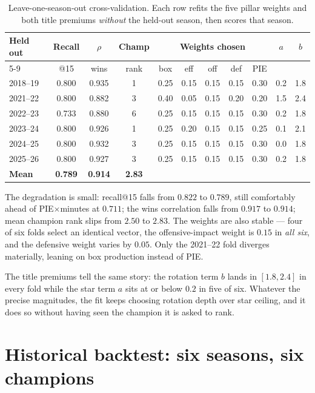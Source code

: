 \documentclass[11pt]{article}
\begin{document}
\begin{table}[h]\centering
\caption{Leave-one-season-out cross-validation. Each row refits the five
pillar weights and both title premiums \emph{without} the held-out season,
then scores that season.}
\small
\begin{tabular}{lcccccccccc}
\toprule
Held out & Recall & $\rho$ & Champ & \multicolumn{5}{c}{Weights chosen} & $a$ & $b$ \\
\cmidrule(lr){5-9}
 & @15 & wins & rank & box & eff & off & def & PIE & & \\
\midrule
2018--19 & 0.800 & 0.935 & 1 & 0.25 & 0.15 & 0.15 & 0.15 & 0.30 & 0.2 & 1.8 \\
2021--22 & 0.800 & 0.882 & 3 & 0.40 & 0.05 & 0.15 & 0.20 & 0.20 & 1.5 & 2.4 \\
2022--23 & 0.733 & 0.880 & 6 & 0.25 & 0.15 & 0.15 & 0.15 & 0.30 & 0.2 & 1.8 \\
2023--24 & 0.800 & 0.926 & 1 & 0.25 & 0.20 & 0.15 & 0.15 & 0.25 & 0.1 & 2.1 \\
2024--25 & 0.800 & 0.932 & 3 & 0.25 & 0.15 & 0.15 & 0.15 & 0.30 & 0.0 & 1.8 \\
2025--26 & 0.800 & 0.927 & 3 & 0.25 & 0.15 & 0.15 & 0.15 & 0.30 & 0.2 & 1.8 \\
\midrule
\textbf{Mean} & \textbf{0.789} & \textbf{0.914} & \textbf{2.83} & \multicolumn{7}{c}{} \\
\bottomrule
\end{tabular}
\end{table}

The degradation is small: recall@15 falls from $0.822$ to $0.789$, still
comfortably ahead of PIE$\times$minutes at $0.711$; the wins correlation falls
from $0.917$ to $0.914$; mean champion rank slips from $2.50$ to $2.83$. The
weights are also stable --- four of six folds select an identical vector, the
offensive-impact weight is $0.15$ in \emph{all six}, and the defensive weight
varies by $0.05$. Only the 2021--22 fold diverges materially, leaning on box
production instead of PIE.

The title premiums tell the same story: the rotation term $b$ lands in
$[1.8, 2.4]$ in every fold while the star term $a$ sits at or below $0.2$ in
five of six. Whatever the precise magnitudes, the fit keeps choosing rotation
depth over star ceiling, and it does so without having seen the champion it is
asked to rank.

\section{Historical backtest: six seasons, six champions}
\label{sec:backtest}
\end{document}
